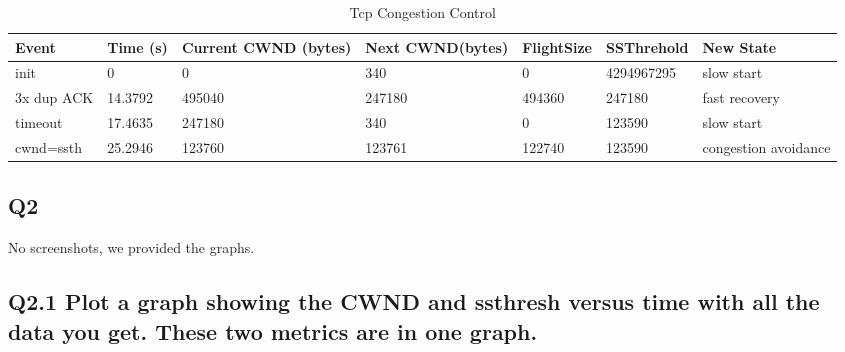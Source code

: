 \documentclass{article}
\begin{document}
\begin{table}[h]
\begin{tabular}{|l|l|l|l|l|l|l|}
\hline
Event           & Time (s)  & Current CWND (bytes) & Next CWND(bytes) & FlightSize & SSThrehold & New State  \\ \hline
init	& 0	& 0	& 340	& 0	& 4294967295 &slow start \\ \hline
3x dup ACK	& 14.3792	& 495040	& 247180	& 494360	& 247180	& fast recovery \\ \hline
timeout	& 17.4635	& 247180	& 340	& 0	& 123590	& slow start \\ \hline
cwnd=ssth	& 25.2946	& 123760	& 123761	& 122740	& 123590	& congestion avoidance \\ \hline

\end{tabular}
\caption{Tcp Congestion Control}
\label{tab:scenario1}
\end{table}



\subsection{Q2}

No screenshots, we provided the graphs.


\subsection{Q2.1 Plot a graph showing the CWND and ssthresh versus time with all the data you get. These two metrics are in one graph.}
\end{document}
